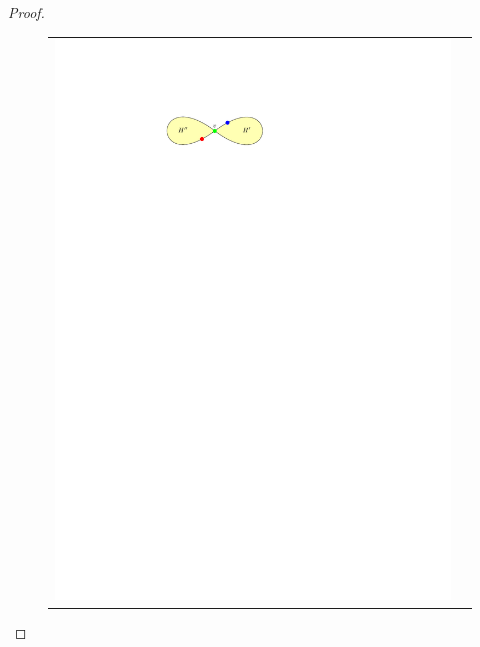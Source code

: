 \documentclass{article}
\theoremstyle{definition}
\begin{document}
\begin{proof}
  \begin{figure}[htbp]
    \centering
    \begin{tabular}{cc}
      \includegraphics[page=1,trim={30 0 30 0},clip]{figs/critical_3_colouring} &

\end{tabular}
\end{figure}
\end{proof}
\end{document}
